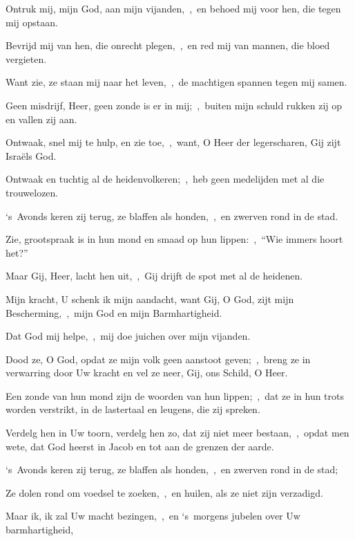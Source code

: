 \documentclass[12pt,twoside,a5paper]{article}
\begin{document}
\begin{halfparskip}

   Ontruk mij, mijn God, aan mijn vijanden,~\sep\ en behoed mij voor hen, die tegen mij opstaan.


  Bevrijd mij van hen, die onrecht plegen,~\sep\ en red mij van mannen, die bloed vergieten.

  Want zie, ze staan mij naar het leven,~\sep\ de machtigen spannen tegen mij samen.

  Geen misdrijf, Heer, geen zonde is er in mij;~\sep\ buiten mijn schuld rukken zij op en vallen zij aan.

  Ontwaak, snel mij te hulp, en zie toe,~\sep\ want, O Heer der legerscharen, Gij zijt Israëls God.

  Ontwaak en tuchtig al de heidenvolkeren;~\sep\ heb geen medelijden met al die trouwelozen.

  `s~Avonds keren zij terug, ze blaffen als honden,~\sep\ en zwerven rond in de stad.

  Zie, grootspraak is in hun mond en smaad op hun lippen:~\sep\ ``Wie immers hoort het?''

  Maar Gij, Heer, lacht hen uit,~\sep\ Gij drijft de spot met al de heidenen.

  Mijn kracht, U schenk ik mijn aandacht, want Gij, O God, zijt mijn Bescherming,~\sep\ mijn God en mijn Barmhartigheid.

  Dat God mij helpe,~\sep\ mij doe juichen over mijn vijanden.

  Dood ze, O God, opdat ze mijn volk geen aanstoot geven;~\sep\ breng ze in verwarring door Uw kracht en vel ze neer, Gij, ons Schild, O Heer.

  Een zonde van hun mond zijn de woorden van hun lippen;~\sep\ dat ze in hun trots worden verstrikt, in de lastertaal en leugens, die zij spreken.

  Verdelg hen in Uw toorn, verdelg hen zo, dat zij niet meer bestaan,~\sep\ opdat men wete, dat God heerst in Jacob en tot aan de grenzen der aarde.

  `s~Avonds keren zij terug, ze blaffen als honden,~\sep\ en zwerven rond in de stad;

  Ze dolen rond om voedsel te zoeken,~\sep\ en huilen, als ze niet zijn verzadigd.

  Maar ik, ik zal Uw macht bezingen,~\sep\ en `s~morgens jubelen over Uw barmhartigheid,


\end{halfparskip}
\end{document}
